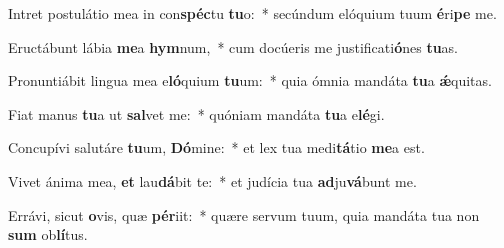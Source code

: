 \item Intret postulátio mea in con\textbf{spéc}tu \textbf{tu}o:~* secúndum elóquium tuum \textbf{é}ri\textbf{pe} me.
\item Eructábunt lábia \textbf{me}a \textbf{hym}num,~* cum docúeris me justificati\textbf{ó}nes \textbf{tu}as.
\item Pronuntiábit lingua mea e\textbf{ló}quium \textbf{tu}um:~* quia ómnia mandáta \textbf{tu}a \textbf{ǽ}quitas.
\item Fiat manus \textbf{tu}a ut \textbf{sal}vet me:~* quóniam mandáta \textbf{tu}a e\textbf{lé}gi.
\item Concupívi salutáre \textbf{tu}um, \textbf{Dó}mine:~* et lex tua medi\textbf{tá}tio \textbf{me}a est.
\item Vivet ánima mea, \textbf{et} lau\textbf{dá}bit te:~* et judícia tua \textbf{ad}ju\textbf{vá}bunt me.
\item Errávi, sicut \textbf{o}vis, quæ \textbf{pér}iit:~* quære servum tuum, quia mandáta tua non \textbf{sum} ob\textbf{lí}tus.
